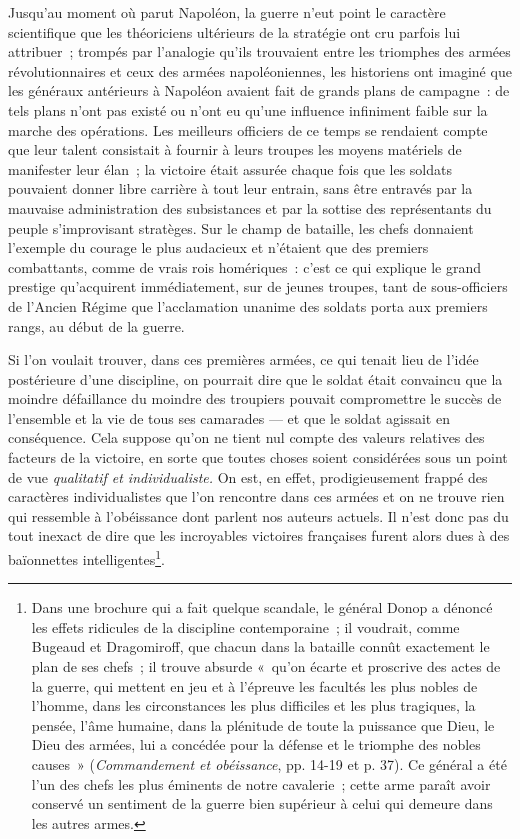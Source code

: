 \documentclass[french,twoside]{book} %
\begin{document}
Jusqu’au moment où parut Napoléon, la guerre n’eut point le caractère scientifique que les théoriciens ultérieurs de la stratégie ont cru parfois lui attribuer ; trompés par l’analogie qu’ils trouvaient entre les triomphes des armées révolutionnaires et ceux des armées napoléoniennes, les historiens ont imaginé que les généraux antérieurs à Napoléon avaient fait de grands plans de campagne : de tels plans n’ont pas existé ou n’ont eu qu’une influence infiniment faible sur la marche des opérations. Les meilleurs officiers de ce temps se rendaient compte que leur talent consistait à fournir à leurs troupes les moyens matériels de manifester leur élan ; la victoire était assurée chaque fois que les soldats pouvaient donner libre carrière à tout leur entrain, sans être entravés par la mauvaise administration des subsistances et par la sottise des représentants du peuple s’improvisant  stratèges. Sur le champ de bataille, les chefs donnaient l’exemple du courage le plus audacieux et n’étaient que des premiers combattants, comme de vrais rois homériques : c’est ce qui explique le grand prestige qu’acquirent immédiatement, sur de jeunes troupes, tant de sous-officiers de l’Ancien Régime que l’acclamation unanime des soldats porta aux premiers rangs, au début de la guerre.\par
Si l’on voulait trouver, dans ces premières armées, ce qui tenait lieu de l’idée postérieure d’une discipline, on pourrait dire que le soldat était convaincu que la moindre défaillance du moindre des troupiers pouvait compromettre le succès de l’ensemble et la vie de tous ses camarades — et que le soldat agissait en conséquence. Cela suppose qu’on ne tient nul compte des valeurs relatives des facteurs de la victoire, en sorte que toutes choses soient considérées sous un point de vue \emph{qualitatif et individualiste.} On est, en effet, prodigieusement frappé des caractères individualistes que l’on rencontre dans ces armées et on ne trouve rien qui ressemble à l’obéissance dont parlent nos auteurs actuels. Il n’est donc pas du tout inexact de dire que les incroyables victoires françaises furent alors dues à des baïonnettes intelligentes\footnote{ \noindent Dans une brochure qui a fait quelque scandale, le général Donop a dénoncé les effets ridicules de la discipline contemporaine ; il voudrait, comme Bugeaud et Dragomiroff, que chacun dans la bataille connût exactement le plan de ses chefs ; il trouve absurde « qu’on écarte et proscrive des actes de la guerre, qui mettent en jeu et à l’épreuve les facultés les plus nobles de l’homme, dans les circonstances les plus difficiles et les plus tragiques, la pensée, l’âme humaine, dans la plénitude de toute la puissance que Dieu, le Dieu des armées, lui a concédée pour la défense et le triomphe des nobles causes » (\emph{Commandement et obéissance}, pp. 14-19 et p. 37). Ce général a été l’un des chefs les plus éminents de notre cavalerie ; cette arme paraît avoir conservé un sentiment de la guerre bien supérieur à celui qui demeure dans les autres armes.
 }.\par
\end{document}
